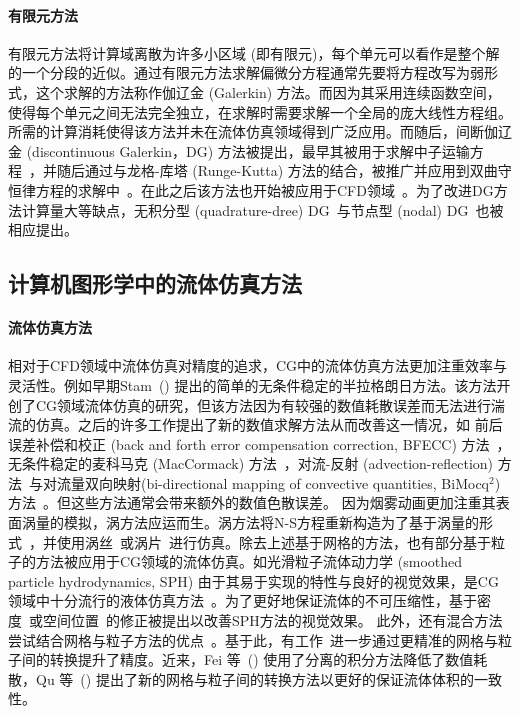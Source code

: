 \paragraph{有限元方法}
有限元方法将计算域离散为许多小区域 (即有限元)，每个单元可以看作是整个解的一个分段的近似。通过有限元方法求解偏微分方程通常先要将方程改写为弱形式，这个求解的方法称作伽辽金 (Galerkin) 方法。而因为其采用连续函数空间，使得每个单元之间无法完全独立，在求解时需要求解一个全局的庞大线性方程组。所需的计算消耗使得该方法并未在流体仿真领域得到广泛应用。而随后，间断伽辽金 (discontinuous Galerkin，DG) 方法被提出，最早其被用于求解中子运输方程~\cite{reed1973triangular}，并随后通过与龙格-库塔 (Runge-Kutta) 方法的结合，被推广并应用到双曲守恒律方程的求解中~\cite{cockburn2001runge, cockburn1990runge, cockburn1989tvb2, cockburn1989tvb3}。在此之后该方法也开始被应用于CFD领域~\cite{Zienkiewicz-2013, lomtev1999discontinuous, bassi1997high}。为了改进DG方法计算量大等缺点，无积分型 (quadrature-dree) DG~\cite{atkins1998quadrature}与节点型 (nodal) DG~\cite{hesthaven2007nodal}也被相应提出。

\subsection{计算机图形学中的流体仿真方法}
\label{sec:1_related_works_CG}
\paragraph{流体仿真方法}
相对于CFD领域中流体仿真对精度的追求，CG中的流体仿真方法更加注重效率与灵活性。例如早期Stam~(\citeyear{Stam-1999}) 提出的简单的无条件稳定的半拉格朗日方法。该方法开创了CG领域流体仿真的研究，但该方法因为有较强的数值耗散误差而无法进行湍流的仿真。之后的许多工作提出了新的数值求解方法从而改善这一情况，如 前后误差补偿和校正 (back and forth error compensation correction, BFECC) 方法~\cite{Kim-2005}，无条件稳定的麦科马克 (MacCormack) 方法~\cite{Selle-2008}，对流-反射 (advection-reflection) 方法~\cite{Zehnder-2018}与对流量双向映射(bi-directional mapping of convective quantities, BiMocq$^2$) 方法~\cite{Qu-2019}。但这些方法通常会带来额外的数值色散误差。
因为烟雾动画更加注重其表面涡量的模拟，涡方法应运而生。涡方法将N-S方程重新构造为了基于涡量的形式~\cite{Park-2005, Selle-2005}，并使用涡丝~\cite{ Weissmann-2010, Angelidis-2005}或涡片~\cite{Zhang-2015, Zhang-2014, Pfaff-2012}进行仿真。除去上述基于网格的方法，也有部分基于粒子的方法被应用于CG领域的流体仿真。如光滑粒子流体动力学 (smoothed particle hydrodynamics, SPH) 由于其易于实现的特性与良好的视觉效果，是CG领域中十分流行的液体仿真方法~\cite{Ihmsen-2014-1, Becker-2007, Adams-2007, Muller-2003, Desbrun-1996}。为了更好地保证流体的不可压缩性，基于密度~\cite{Bender-2015, Ihmsen-2014-2, Solenthaler-2009}或空间位置~\cite{Macklin-2013}的修正被提出以改善SPH方法的视觉效果。
此外，还有混合方法尝试结合网格与粒子方法的优点~\cite{Zhu-2005, Foster-1996, Brackbill-1986, Harlow-1962}。基于此，有工作~\cite{Fu-2017, Jiang-2015}进一步通过更精准的网格与粒子间的转换提升了精度。近来，Fei 等~(\citeyear{Fei-2021}) 使用了分离的积分方法降低了数值耗散，Qu 等~(\citeyear{Qu-2022}) 提出了新的网格与粒子间的转换方法以更好的保证流体体积的一致性。

